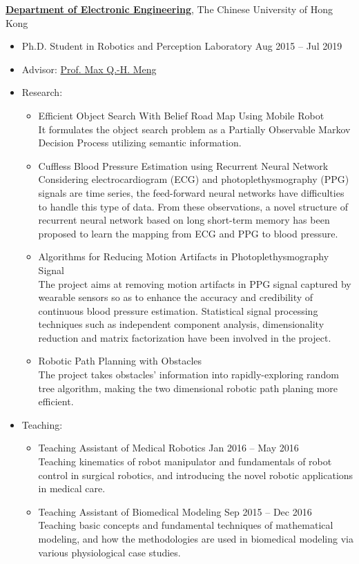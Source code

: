 {\bf \href{https://www.ee.cuhk.edu.hk/}{Department of Electronic Engineering}}, The Chinese University of Hong Kong
\begin{itemize}
    \item[] Ph.D. Student in Robotics and Perception Laboratory \hfill Aug 2015 -- Jul 2019
    \item[] Advisor: \href{http://www.ee.cuhk.edu.hk/~qhmeng/about.html}{Prof. Max Q.-H. Meng}
    \item[] Research:
    \begin{itemize}
        \item Efficient Object Search With Belief Road Map Using Mobile Robot~\cite{wang2018efficient} \\
        It formulates the object search problem as a Partially Observable Markov Decision Process utilizing semantic information.
        \item Cuffless Blood Pressure Estimation using Recurrent Neural Network~\cite{lo2017continuous} \\
        Considering electrocardiogram (ECG) and photoplethysmography (PPG) signals are time series, the feed-forward neural networks have difficulties to handle this type of data.
        From these observations, a novel structure of recurrent neural network based on long short-term memory has been proposed to learn the mapping from ECG and PPG to blood pressure.
        \item Algorithms for Reducing Motion Artifacts in Photoplethysmography Signal~\cite{lo2017motion} \\
        The project aims at removing motion artifacts in PPG signal captured by wearable sensors so as to enhance the accuracy and credibility of continuous blood pressure estimation.
        Statistical signal processing techniques such as independent component analysis, dimensionality reduction and matrix factorization have been involved in the project.
        \item Robotic Path Planning with Obstacles~\cite{wang2016improved} \\
        The project takes obstacles' information into rapidly-exploring random tree algorithm, making the two dimensional robotic path planing more efficient.
    \end{itemize}
    \item[] Teaching:
    \begin{itemize}
        \item Teaching Assistant of Medical Robotics \hfill Jan 2016 -- May 2016 \\
        Teaching kinematics of robot manipulator and fundamentals of robot control in surgical robotics, and introducing the novel robotic applications in medical care.
        \item Teaching Assistant of Biomedical Modeling \hfill Sep 2015 -- Dec 2016 \\
        Teaching basic concepts and fundamental techniques of mathematical modeling, and how the methodologies are used in biomedical modeling via various physiological case studies.
    \end{itemize}
\end{itemize}
